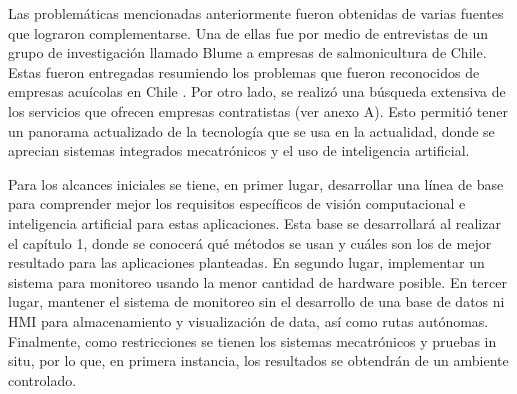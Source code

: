 
Las problemáticas mencionadas anteriormente fueron obtenidas de varias fuentes que lograron complementarse. Una de ellas fue por medio de entrevistas de un grupo de investigación llamado Blume a empresas de salmonicultura de Chile. Estas fueron entregadas resumiendo los problemas que fueron reconocidos de empresas acuícolas en Chile \cite{Entrevistas_Blume}. Por otro lado, se realizó una búsqueda extensiva de los servicios que ofrecen empresas contratistas (ver anexo A). Esto permitió tener un panorama actualizado de la tecnología que se usa en la actualidad, donde se aprecian sistemas integrados mecatrónicos y el uso de inteligencia artificial.


Para los alcances iniciales se tiene, en primer lugar, desarrollar una línea de base para comprender mejor los requisitos específicos de visión computacional e inteligencia artificial para estas aplicaciones. Esta base se desarrollará al realizar el capítulo 1, donde se conocerá qué métodos se usan y cuáles son los de mejor resultado para las aplicaciones planteadas. En segundo lugar, implementar un sistema para monitoreo usando la menor cantidad de hardware posible. En tercer lugar, mantener el sistema de monitoreo sin el desarrollo de una base de datos ni HMI para almacenamiento y visualización de data, así como rutas autónomas. Finalmente, como restricciones se tienen los sistemas mecatrónicos y pruebas in situ, por lo que, en primera instancia, los resultados se obtendrán de un ambiente controlado. 
